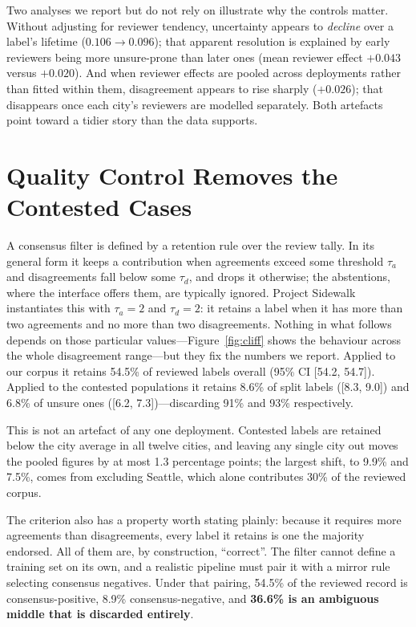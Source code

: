 \documentclass[sigconf]{acmart}
\begin{document}
Two analyses we report but do not rely on illustrate why the controls matter.
Without adjusting for reviewer tendency, uncertainty appears to \emph{decline}
over a label's lifetime ($0.106 \rightarrow 0.096$); that apparent resolution is
explained by early reviewers being more unsure-prone than later ones (mean
reviewer effect $+0.043$ versus $+0.020$). And when reviewer effects are pooled
across deployments rather than fitted within them, disagreement appears to rise
sharply ($+0.026$); that disappears once each city's reviewers are modelled
separately. Both artefacts point toward a tidier story than the data supports.

\section{Quality Control Removes the Contested Cases}
\label{sec:qc}

A consensus filter is defined by a retention rule over the review tally. In its
general form it keeps a contribution when agreements exceed some threshold
$\tau_a$ and disagreements fall below some $\tau_d$, and drops it otherwise;
the abstentions, where the interface offers them, are typically ignored. Project
Sidewalk instantiates this with $\tau_a = 2$ and $\tau_d = 2$: it retains a
label when it has more than two agreements and no more than two disagreements.
Nothing in what follows depends on those particular values---Figure~\ref{fig:cliff}
shows the behaviour across the whole disagreement range---but they fix the
numbers we report. Applied to our corpus it
retains 54.5\% of reviewed labels overall (95\% CI [54.2, 54.7]). Applied to the
contested populations it retains 8.6\% of split labels ([8.3, 9.0]) and 6.8\% of
unsure ones ([6.2, 7.3])---discarding 91\% and 93\% respectively.

This is not an artefact of any one deployment. Contested labels are retained
below the city average in all twelve cities, and leaving any single city out
moves the pooled figures by at most 1.3 percentage points; the largest shift, to
9.9\% and 7.5\%, comes from excluding Seattle, which alone contributes 30\% of
the reviewed corpus.

The criterion also has a property worth stating plainly: because it requires
more agreements than disagreements, every label it retains is one the majority
endorsed. All of them are, by construction, ``correct''. The filter cannot
define a training set on its own, and a realistic pipeline must pair it with a
mirror rule selecting consensus negatives. Under that pairing, 54.5\% of the
reviewed record is consensus-positive, 8.9\% consensus-negative, and
\textbf{36.6\% is an ambiguous middle that is discarded entirely}.
\end{document}
